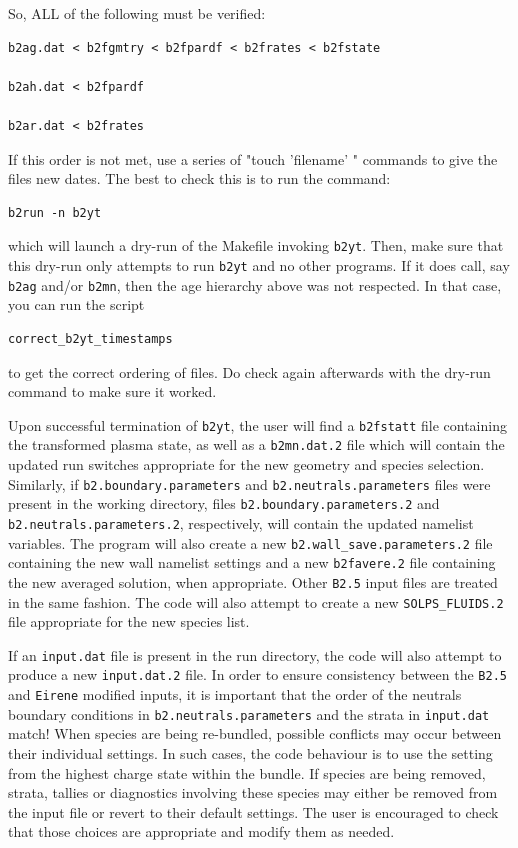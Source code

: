 \documentclass[a4paper,10pt]{report}
\begin{document}
So, ALL of the following must be verified:
\begin{verbatim}
b2ag.dat < b2fgmtry < b2fpardf < b2frates < b2fstate

b2ah.dat < b2fpardf

b2ar.dat < b2frates
\end{verbatim}
If this order is not met, use a series of "touch 'filename' " commands
to give the files new dates. The best to check this is to run the command:
\begin{verbatim}
b2run -n b2yt
\end{verbatim}
which will launch a dry-run of the Makefile invoking {\tt b2yt}. Then, make sure
that this dry-run only attempts to run {\tt b2yt} and no other programs. If it
does call, say {\tt b2ag} and/or {\tt b2mn}, then the age hierarchy above was
not respected. In that case, you can run the script
\begin{verbatim}
correct_b2yt_timestamps
\end{verbatim}
to get the correct ordering of files. Do check again afterwards with the dry-run
command to make sure it worked.

Upon successful termination of {\tt b2yt}, the user will find a {\tt b2fstatt}
file containing the transformed plasma state, as well as a {\tt b2mn.dat.2} file which
will contain the updated run switches appropriate for the new geometry and species
selection. Similarly, if
{\tt b2.boundary.parameters} and {\tt b2.neutrals.parameters} files were present
in the working directory, files {\tt b2.boundary.parameters.2} and
{\tt b2.neutrals.parameters.2},
respectively, will contain the updated namelist variables. The program will also create
a new {\tt b2.wall\_save.parameters.2} file containing the new wall namelist settings
 and a new {\tt b2favere.2} file containing the new averaged solution, when appropriate. Other {\tt B2.5} input files are treated in the same fashion. The
code will also attempt to create a new {\tt SOLPS\_FLUIDS.2} file appropriate for the
new species list.

If an {\tt input.dat} file is present in the run directory, the code will also attempt
to produce a new {\tt input.dat.2} file. In order to
ensure consistency between the {\tt B2.5} and {\tt Eirene} modified inputs, it is
important that the order of the neutrals boundary conditions in
{\tt b2.neutrals.parameters} and the strata in {\tt input.dat} match!
When species are being re-bundled, possible
conflicts may occur between their individual settings. In such cases, the code behaviour
is to use the setting from the highest charge state within the bundle. If species are
being removed, strata, tallies or diagnostics involving these species may either be
removed from the input file or revert to their default settings. The user is encouraged
to check that those choices are appropriate and modify them as needed.
\end{document}
